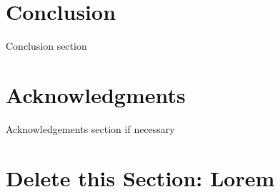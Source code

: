 \documentclass{iiair}
\begin{document}
\section{Conclusion}
Conclusion section
\section{Acknowledgments}
Acknowledgements section if necessary


\section{Delete this Section: Lorem}
\lipsum[2-5]


\newpage


\end{document}
